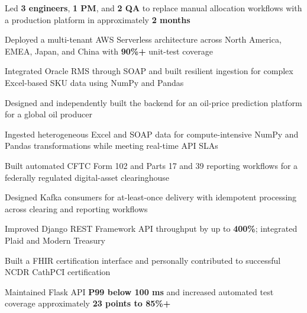 
\begin{cvitems}
  \item Led \textbf{3 engineers}, \textbf{1 PM}, and \textbf{2 QA} to replace manual allocation workflows with a production platform in approximately \textbf{2 months}
  \item Deployed a multi-tenant AWS Serverless architecture across North America, EMEA, Japan, and China with \textbf{90\%+} unit-test coverage
  \item Integrated Oracle RMS through SOAP and built resilient ingestion for complex Excel-based SKU data using NumPy and Pandas
\end{cvitems}

\begin{cvitems}
  \item Designed and independently built the backend for an oil-price prediction platform for a global oil producer
  \item Ingested heterogeneous Excel and SOAP data for compute-intensive NumPy and Pandas transformations while meeting real-time API SLAs
\end{cvitems}

\begin{cvitems}
  \item Built automated CFTC Form 102 and Parts 17 and 39 reporting workflows for a federally regulated digital-asset clearinghouse
  \item Designed Kafka consumers for at-least-once delivery with idempotent processing across clearing and reporting workflows
  \item Improved Django REST Framework API throughput by up to \textbf{400\%}; integrated Plaid and Modern Treasury
\end{cvitems}

\begin{cvitems}
  \item Built a FHIR certification interface and personally contributed to successful NCDR CathPCI certification
  \item Maintained Flask API \textbf{P99 below 100 ms} and increased automated test coverage approximately \textbf{23 points to 85\%+}
\end{cvitems}

